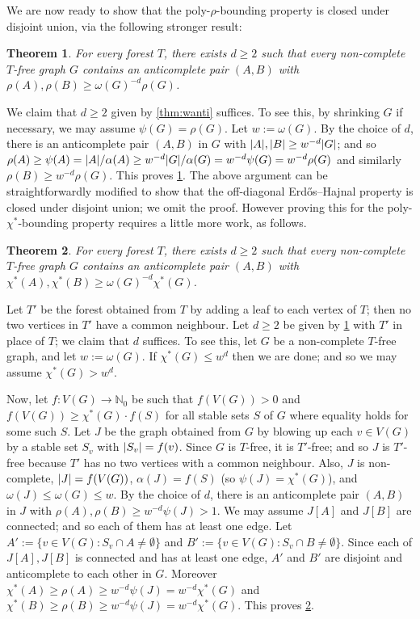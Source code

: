 \documentclass[11pt,reqno]{amsart}
\newtheorem{theorem}{Theorem}[section]
\let\oldendproof\endproof
\renewenvironment{proof}[1][\proofname]{%
	\oldproof[\normalfont\bfseries #1]%
}{\oldendproof}
\newcommand{\mab}{\mathbb}
\newcommand{\erh}{Erd\H{o}s--Hajnal}
\newcommand{\chis}{\chi^*}
\DeclarePairedDelimiter\abs{\lvert}{\rvert}%
\begin{document}
	We are now ready to show that the poly-$\rho$-bounding property is closed under disjoint union, via the following stronger result:
	\begin{theorem}
		\label{thm:rhoanti}
		For every forest $T$, there exists $d\ge2$ such that every non-complete $T$-free graph $G$ contains an anticomplete pair $(A,B)$ with $\rho(A),\rho(B)\ge \omega(G)^{-d}\rho(G)$.
	\end{theorem}
	\begin{proof}
		We claim that $d\ge2$ given by \cref{thm:wanti} suffices.
		To see this, by shrinking $G$ if necessary, we may assume $\psi(G)=\rho(G)$. Let $w:=\omega(G)$.
		By the choice of $d$, there is an anticomplete pair $(A,B)$ in $G$ with $\abs A,\abs B\ge w^{-d}\abs G$;
		and so $\rho(A)\ge \psi(A)=\abs A/\alpha(A)\ge w^{-d}\abs G/\alpha(G)=w^{-d}\psi(G)=w^{-d}\rho(G)$
		and similarly $\rho(B)\ge w^{-d}\rho(G)$.
		This proves \cref{thm:rhoanti}.
	\end{proof}
	The above argument can be straightforwardly modified to show that the off-diagonal \erh{} property is closed under disjoint union; we omit the proof.
	However proving this for the poly-$\chis$-bounding property requires a little more work, as follows.
	\begin{theorem}
		\label{thm:chisanti}
		For every forest $T$, there exists $d\ge2$ such that every non-complete $T$-free graph $G$ contains an anticomplete pair $(A,B)$ with $\chis(A),\chis(B)\ge \omega(G)^{-d}\chis(G)$.
	\end{theorem}
	\begin{proof}
		Let $T'$ be the forest obtained from $T$ by adding a leaf to each vertex of $T$;
		then no two vertices in $T'$ have a common neighbour.
		Let $d\ge2$ be given by \cref{thm:rhoanti} with $T'$ in place of $T$; we claim that $d$ suffices.
		To see this, let $G$ be a non-complete $T$-free graph, and let $w:=\omega(G)$.
		If $\chis(G)\le w^{d}$ then we are done;
		and so we may assume $\chis(G)>w^{d}$.
		
		Now, let $f\colon V(G)\to\mab N_0$ be such that $f(V(G))>0$ and $f(V(G))\ge\chis(G)\cdot f(S)$ for all stable sets $S$ of $G$ where equality holds for some such $S$.
		Let $J$ be the graph obtained from $G$ by blowing up each $v\in V(G)$ by a stable set $S_v$ with $\abs{S_v}=f(v)$.
		Since $G$ is $T$-free, it is $T'$-free; and so $J$ is $T'$-free because $T'$ has no two vertices with a common neighbour.
		Also, $J$ is non-complete, $\abs J=f(V(G))$, $\alpha(J)=f(S)$ (so $\psi(J)=\chis(G)$), and $\omega(J)\le\omega(G)\le w$.
		By the choice of $d$, there is an anticomplete pair $(A,B)$ in $J$ with $\rho(A),\rho(B)\ge w^{-d}\psi(J)>1$.
		We may assume $J[A]$ and $J[B]$ are connected;
		and so each of them has at least one edge.
		Let $A':=\{v\in V(G):S_v\cap A\ne\emptyset\}$ and $B':=\{v\in V(G):S_v\cap B\ne\emptyset\}$.
		Since each of $J[A],J[B]$ is connected and has at least one edge, $A'$ and $B'$ are disjoint and anticomplete to each other in $G$.
		Moreover $\chis(A)\ge\rho(A)\ge w^{-d}\psi(J)=w^{-d}\chis(G)$
		and $\chis(B)\ge \rho(B)\ge w^{-d}\psi(J)=w^{-d}\chis(G)$.
		This proves \cref{thm:chisanti}.
	\end{proof}
\end{document}
